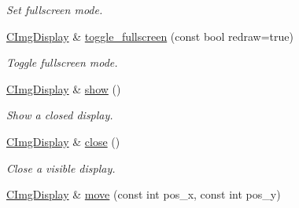\begin{DoxyCompactItemize}
\begin{DoxyCompactList}\small\item\em Set fullscreen mode. \item\end{DoxyCompactList}\item 
\hypertarget{structcimg__library_1_1CImgDisplay_a62d224a7c18d3091eb0d56e1bc8c36fe}{
\hyperlink{structcimg__library_1_1CImgDisplay}{CImgDisplay} \& \hyperlink{structcimg__library_1_1CImgDisplay_a62d224a7c18d3091eb0d56e1bc8c36fe}{toggle\_\-fullscreen} (const bool redraw=true)}
\label{structcimg__library_1_1CImgDisplay_a62d224a7c18d3091eb0d56e1bc8c36fe}

\begin{DoxyCompactList}\small\item\em Toggle fullscreen mode. \item\end{DoxyCompactList}\item 
\hypertarget{structcimg__library_1_1CImgDisplay_a1b27a2a375509146444ab06b2f7b8851}{
\hyperlink{structcimg__library_1_1CImgDisplay}{CImgDisplay} \& \hyperlink{structcimg__library_1_1CImgDisplay_a1b27a2a375509146444ab06b2f7b8851}{show} ()}
\label{structcimg__library_1_1CImgDisplay_a1b27a2a375509146444ab06b2f7b8851}

\begin{DoxyCompactList}\small\item\em Show a closed display. \item\end{DoxyCompactList}\item 
\hypertarget{structcimg__library_1_1CImgDisplay_a7e35c3363f8859c8a952a60dd4aa3fca}{
\hyperlink{structcimg__library_1_1CImgDisplay}{CImgDisplay} \& \hyperlink{structcimg__library_1_1CImgDisplay_a7e35c3363f8859c8a952a60dd4aa3fca}{close} ()}
\label{structcimg__library_1_1CImgDisplay_a7e35c3363f8859c8a952a60dd4aa3fca}

\begin{DoxyCompactList}\small\item\em Close a visible display. \item\end{DoxyCompactList}\item 
\hypertarget{structcimg__library_1_1CImgDisplay_a21da6f48a7ed419e7605f02925be4718}{
\hyperlink{structcimg__library_1_1CImgDisplay}{CImgDisplay} \& \hyperlink{structcimg__library_1_1CImgDisplay_a21da6f48a7ed419e7605f02925be4718}{move} (const int pos\_\-x, const int pos\_\-y)}
\label{structcimg__library_1_1CImgDisplay_a21da6f48a7ed419e7605f02925be4718}


\end{DoxyCompactItemize}
